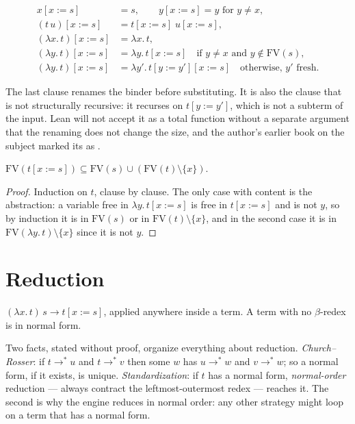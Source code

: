 \begin{definition}
  \begin{align*}
    x[x := s] &= s, \qquad y[x := s] = y \text{ for } y \neq x, \\
    (t\, u)[x := s] &= t[x := s]\; u[x := s], \\
    (\lambda x.\, t)[x := s] &= \lambda x.\, t, \\
    (\lambda y.\, t)[x := s] &= \lambda y.\, t[x := s] \quad\text{if } y \neq x \text{ and } y \notin \mathrm{FV}(s), \\
    (\lambda y.\, t)[x := s] &= \lambda y'.\, t[y := y'][x := s] \quad\text{otherwise, } y' \text{ fresh.}
  \end{align*}
\end{definition}

The last clause renames the binder before substituting. It is also the clause that is not
structurally recursive: it recurses on $t[y := y']$, which is not a subterm of the input. Lean
will not accept it as a total function without a separate argument that the renaming does not
change the size, and the author's earlier book on the subject marked its  as
.

\begin{theorem}
  $\mathrm{FV}(t[x := s]) \subseteq \mathrm{FV}(s) \cup (\mathrm{FV}(t) \setminus \{x\})$.
\end{theorem}
\begin{proof}
  Induction on $t$, clause by clause. The only case with content is the abstraction: a variable
  free in $\lambda y.\, t[x := s]$ is free in $t[x := s]$ and is not $y$, so by induction it is in
  $\mathrm{FV}(s)$ or in $\mathrm{FV}(t) \setminus \{x\}$, and in the second case it is in
  $\mathrm{FV}(\lambda y.\, t) \setminus \{x\}$ since it is not $y$.
\end{proof}

\section{Reduction}

\begin{definition}[$\beta$]
  $(\lambda x.\, t)\, s \to t[x := s]$, applied anywhere inside a term. A term with no
  $\beta$-redex is in normal form.
\end{definition}

Two facts, stated without proof, organize everything about reduction. \emph{Church--Rosser}: if
$t \to^* u$ and $t \to^* v$ then some $w$ has $u \to^* w$ and $v \to^* w$; so a normal form, if it
exists, is unique. \emph{Standardization}: if $t$ has a normal form, \emph{normal-order}
reduction --- always contract the leftmost-outermost redex --- reaches it. The second is why the
engine reduces in normal order: any other strategy might loop on a term that has a normal form.

